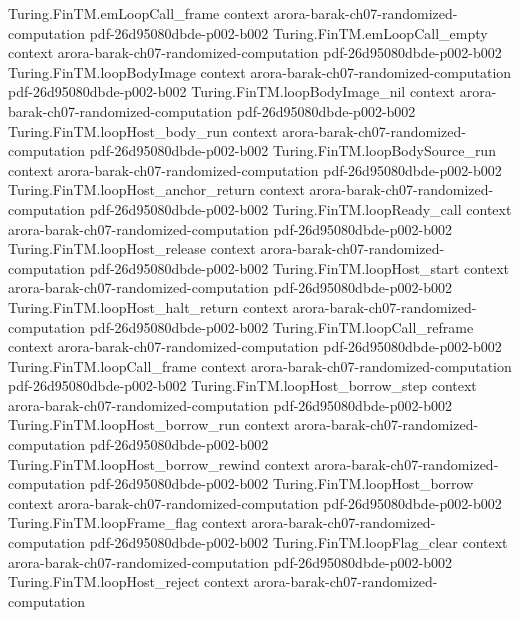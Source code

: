 \begin{theorem}
\proofstep
  {Turing.FinTM.emLoopCall_frame}
  {context}
  {arora-barak-ch07-randomized-computation}
  {pdf-26d95080dbde-p002-b002}
\proofstep
  {Turing.FinTM.emLoopCall_empty}
  {context}
  {arora-barak-ch07-randomized-computation}
  {pdf-26d95080dbde-p002-b002}
\proofstep
  {Turing.FinTM.loopBodyImage}
  {context}
  {arora-barak-ch07-randomized-computation}
  {pdf-26d95080dbde-p002-b002}
\proofstep
  {Turing.FinTM.loopBodyImage_nil}
  {context}
  {arora-barak-ch07-randomized-computation}
  {pdf-26d95080dbde-p002-b002}
\proofstep
  {Turing.FinTM.loopHost_body_run}
  {context}
  {arora-barak-ch07-randomized-computation}
  {pdf-26d95080dbde-p002-b002}
\proofstep
  {Turing.FinTM.loopBodySource_run}
  {context}
  {arora-barak-ch07-randomized-computation}
  {pdf-26d95080dbde-p002-b002}
\proofstep
  {Turing.FinTM.loopHost_anchor_return}
  {context}
  {arora-barak-ch07-randomized-computation}
  {pdf-26d95080dbde-p002-b002}
\proofstep
  {Turing.FinTM.loopReady_call}
  {context}
  {arora-barak-ch07-randomized-computation}
  {pdf-26d95080dbde-p002-b002}
\proofstep
  {Turing.FinTM.loopHost_release}
  {context}
  {arora-barak-ch07-randomized-computation}
  {pdf-26d95080dbde-p002-b002}
\proofstep
  {Turing.FinTM.loopHost_start}
  {context}
  {arora-barak-ch07-randomized-computation}
  {pdf-26d95080dbde-p002-b002}
\proofstep
  {Turing.FinTM.loopHost_halt_return}
  {context}
  {arora-barak-ch07-randomized-computation}
  {pdf-26d95080dbde-p002-b002}
\proofstep
  {Turing.FinTM.loopCall_reframe}
  {context}
  {arora-barak-ch07-randomized-computation}
  {pdf-26d95080dbde-p002-b002}
\proofstep
  {Turing.FinTM.loopCall_frame}
  {context}
  {arora-barak-ch07-randomized-computation}
  {pdf-26d95080dbde-p002-b002}
\proofstep
  {Turing.FinTM.loopHost_borrow_step}
  {context}
  {arora-barak-ch07-randomized-computation}
  {pdf-26d95080dbde-p002-b002}
\proofstep
  {Turing.FinTM.loopHost_borrow_run}
  {context}
  {arora-barak-ch07-randomized-computation}
  {pdf-26d95080dbde-p002-b002}
\proofstep
  {Turing.FinTM.loopHost_borrow_rewind}
  {context}
  {arora-barak-ch07-randomized-computation}
  {pdf-26d95080dbde-p002-b002}
\proofstep
  {Turing.FinTM.loopHost_borrow}
  {context}
  {arora-barak-ch07-randomized-computation}
  {pdf-26d95080dbde-p002-b002}
\proofstep
  {Turing.FinTM.loopFrame_flag}
  {context}
  {arora-barak-ch07-randomized-computation}
  {pdf-26d95080dbde-p002-b002}
\proofstep
  {Turing.FinTM.loopFlag_clear}
  {context}
  {arora-barak-ch07-randomized-computation}
  {pdf-26d95080dbde-p002-b002}
\proofstep
  {Turing.FinTM.loopHost_reject}
  {context}
  {arora-barak-ch07-randomized-computation}

\end{theorem}
